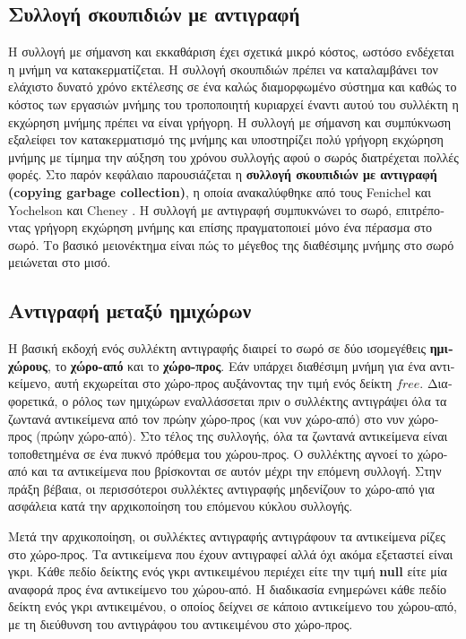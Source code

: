 \begin{greek}
\chapter{Συλλογή σκουπιδιών με αντιγραφή}\label{ch:cop}
Η συλλογή με σήμανση και εκκαθάριση έχει σχετικά μικρό κόστος,
ωστόσο ενδέχεται η μνήμη να κατακερματίζεται. Η συλλογή σκουπιδιών
πρέπει να καταλαμβάνει τον ελάχιστο δυνατό χρόνο εκτέλεσης σε
ένα καλώς διαμορφωμένο σύστημα και καθώς το κόστος των εργασιών 
μνήμης του τροποποιητή κυριαρχεί έναντι αυτού του συλλέκτη η
εκχώρηση μνήμης πρέπει να είναι γρήγορη. Η συλλογή με σήμανση
και συμπύκνωση εξαλείφει τον κατακερματισμό της μνήμης και 
υποστηρίζει πολύ γρήγορη εκχώρηση μνήμης με τίμημα την αύξηση 
του χρόνου συλλογής αφού ο σωρός διατρέχεται πολλές φορές. Στο 
παρόν κεφάλαιο παρουσιάζεται η \textbf{συλλογή σκουπιδιών με 
αντιγραφή (copying garbage collection)}, η οποία ανακαλύφθηκε 
από τους Fenichel και Yochelson \cite{DBLP:journals/cacm/FenichelY69} 
και Cheney \cite{DBLP:journals/cacm/Cheney70}. Η συλλογή με 
αντιγραφή συμπυκνώνει το σωρό, επιτρέποντας γρήγορη εκχώρηση
μνήμης και επίσης πραγματοποιεί μόνο ένα πέρασμα στο σωρό. Το 
βασικό μειονέκτημα είναι πώς το μέγεθος της διαθέσιμης μνήμης 
στο σωρό μειώνεται στο μισό.

\section{Αντιγραφή μεταξύ ημιχώρων}
Η βασική εκδοχή ενός συλλέκτη αντιγραφής διαιρεί το σωρό σε δύο 
ισομεγέθεις \textbf{ημιχώρους}, το \textbf{χώρο-από} και το \textbf{χώρο-προς}.
Εάν υπάρχει διαθέσιμη μνήμη για ένα αντικείμενο, αυτή εκχωρείται στο χώρο-προς 
αυξάνοντας την τιμή ενός δείκτη $free$. Διαφορετικά, ο ρόλος των 
ημιχώρων εναλλάσσεται πριν ο συλλέκτης αντιγράψει όλα τα ζωντανά 
αντικείμενα από τον πρώην χώρο-προς (και νυν χώρο-από) στο νυν 
χώρο-προς (πρώην χώρο-από). Στο τέλος της συλλογής, όλα τα ζωντανά 
αντικείμενα είναι τοποθετημένα σε ένα πυκνό πρόθεμα του χώρου-προς. 
Ο συλλέκτης αγνοεί το χώρο-από και τα αντικείμενα που βρίσκονται σε 
αυτόν μέχρι την επόμενη συλλογή. Στην πράξη βέβαια, οι περισσότεροι 
συλλέκτες αντιγραφής μηδενίζουν το χώρο-από για ασφάλεια κατά την
αρχικοποίηση του επόμενου κύκλου συλλογής. 

Μετά την αρχικοποίηση, οι συλλέκτες αντιγραφής αντιγράφουν τα 
αντικείμενα ρίζες στο χώρο-προς. Τα αντικείμενα που έχουν αντιγραφεί 
αλλά όχι ακόμα εξεταστεί είναι γκρι. Κάθε πεδίο δείκτης ενός 
γκρι αντικειμένου περιέχει είτε την τιμή \textbf{null} είτε μία 
αναφορά προς ένα αντικείμενο του χώρου-από. Η διαδικασία 
ενημερώνει κάθε πεδίο δείκτη ενός γκρι αντικειμένου, ο οποίος 
δείχνει σε κάποιο αντικείμενο του χώρου-από, με τη διεύθυνση 
του αντιγράφου του αντικειμένου στο χώρο-προς. 


\end{greek}
